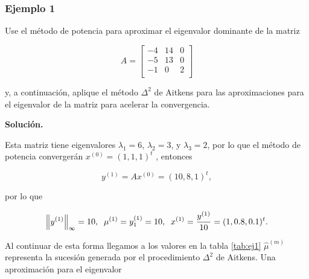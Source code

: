 \documentclass[12pt, a4paper]{article}
\numberwithin{subsection}{section} %
\begin{document}
        \subsubsection*{Ejemplo 1} %
        
            Use el método de potencia para aproximar el eigenvalor dominante de la matriz
        
            $$A =\begin{bmatrix}
                -4 & 14 & 0 \\
                -5 & 13 & 0 \\
                -1 & 0 & 2 \\
            \end{bmatrix}$$
        
            y, a continuación, aplique el método $\Delta^2$ de Aitkens para las aproximaciones para el eigenvalor de la matriz para acelerar la convergencia.
        
            {\bf Solución.}
        
            Esta matriz tiene eigenvalores $\lambda_1 = 6$, $\lambda_2 = 3$, y $\lambda_3 = 2$, por lo que el método de potencia convergerán $x^{(0)} = (1, 1, 1)^t$ , entonces
        
            $$y^{(1)} = Ax^{(0)} = (10, 8, 1)^t,$$
        
            por lo que
        
            $$\left\|y^{(1)}\right\|_{\infty} = 10, \;\; \mu^{(1)} = y_1^{(1)} = 10, \;\; x^{(1)} = {y^{(1)} \over 10} = (1, 0.8, 0.1)^t.$$
        
            Al continuar de esta forma llegamos a los valores en la tabla \ref{tab:ej1} $\hat{\mu}^{(m)}$ representa la sucesión generada por el procedimiento $\Delta^2$ de Aitkens. Una aproximación para el eigenvalor
        
\end{document}
